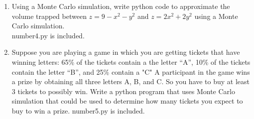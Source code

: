 \documentclass[10pt,letterpaper]{article}
\begin{document}
\begin{enumerate}
\item Using a Monte Carlo simulation, write python code to approximate the volume trapped between $z=9-x^2-y^2$ and $z=2x^2+2y^2$ using a Monte Carlo simulation.
\\
number4.py is included.

\item Suppose you are playing a game in which you are getting tickets that have winning letters:
65\% of the tickets contain a the letter ``A'', 10\% of the tickets contain the letter ``B'', and 25\% contain a "C"
A participant in the game wins a prize by obtaining all three letters A, B, and C.  So you have to buy at least 3 tickets to possibly win.   
Write a python program that uses Monte Carlo simulation that  could be used to determine how many tickets you expect to buy to win a prize.
number5.py is included.


\end{enumerate}
\end{document}
